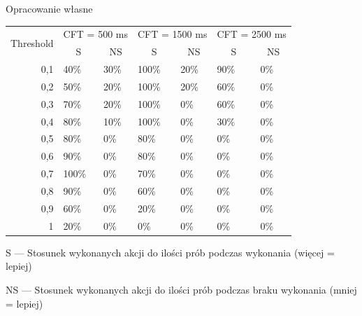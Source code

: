 \documentclass[skorowidz,skroty]{dyplomWEZUT}
\begin{document}
{Opracowanie własne}
{
    \begin{threeparttable}
        \begin{tabularx}{.95\linewidth}{r|X|X|X|X|X|X}
            \multicolumn{1}{c|}{\multirow{2}{*}{Threshold}} & \multicolumn{2}{c|}{CFT = 500 ms} & \multicolumn{2}{c|}{CFT = 1500 ms} & \multicolumn{2}{c}{CFT = 2500 ms} \\ \cline{2-7} 
            \multicolumn{1}{c|}{} & \multicolumn{1}{c|}{S} & \multicolumn{1}{c|}{NS} & \multicolumn{1}{c|}{S} & \multicolumn{1}{c|}{NS} & \multicolumn{1}{c|}{S} & \multicolumn{1}{c}{NS} \\ \hline\hline
            0,1 & 40\% & 30\% & 100\% & 20\% & 90\% & 0\% \\ \hline
            0,2 & 50\% & 20\% & 100\% & 20\% & 60\% & 0\% \\ \hline
            0,3 & 70\% & 20\% & 100\% & 0\% & 60\% & 0\% \\ \hline
            0,4 & 80\% & 10\% & 100\% & 0\% & 30\% & 0\% \\ \hline
            0,5 & 80\% & 0\% & 80\% & 0\% & 0\% & 0\% \\ \hline
            0,6 & 90\% & 0\% & 80\% & 0\% & 0\% & 0\% \\ \hline
            0,7 & 100\% & 0\% & 70\% & 0\% & 0\% & 0\% \\ \hline
            0,8 & 90\% & 0\% & 60\% & 0\% & 0\% & 0\% \\ \hline
            0,9 & 60\% & 0\% & 20\% & 0\% & 0\% & 0\% \\ \hline
            1 & 20\% & 0\% & 0\% & 0\% & 0\% & 0\% \\
        \end{tabularx}
        \begin{tablenotes}
            \item \hphantom{N}S --- Stosunek wykonanych akcji do ilości prób podczas wykonania (więcej = lepiej)
            \item NS --- Stosunek wykonanych akcji do ilości prób podczas braku wykonania (mniej = lepiej)
        \end{tablenotes}
    \end{threeparttable}
}
\end{document}
